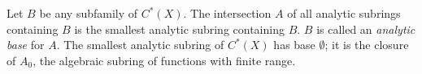 Let $B$ be any subfamily of $C^*(X)$. The intersection $A$ of all analytic subrings containing $B$ is the smallest analytic subring containing $B$. $B$ is called an \emph{analytic base} for $A$. The smallest analytic subring of $C^*(X)$ has base $\emptyset$; it is the closure of $A_0$, the algebraic subring of functions with finite range.
